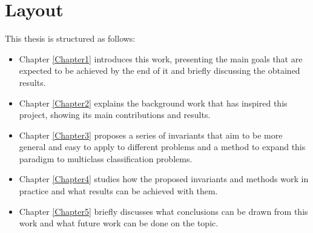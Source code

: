 

\section{Layout}

This thesis is structured as follows:

\begin{itemize}
    \item Chapter \ref{Chapter1} introduces this work, presenting the main goals that are expected
    to be achieved by the end of it and briefly discussing the obtained results.
    \item Chapter \ref{Chapter2} explains the background work that has inspired this project,
    showing its main contributions and results.
    \item Chapter \ref{Chapter3} proposes a series of invariants that aim to be more general and easy
    to apply to different problems and a method to expand this paradigm to multiclass classification
    problems.
    \item Chapter \ref{Chapter4} studies how the proposed invariants and methods work in practice
    and what results can be achieved with them.
    \item Chapter \ref{Chapter5} briefly discusses what conclusions can be drawn from this work
    and what future work can be done on the topic.
\end{itemize}

